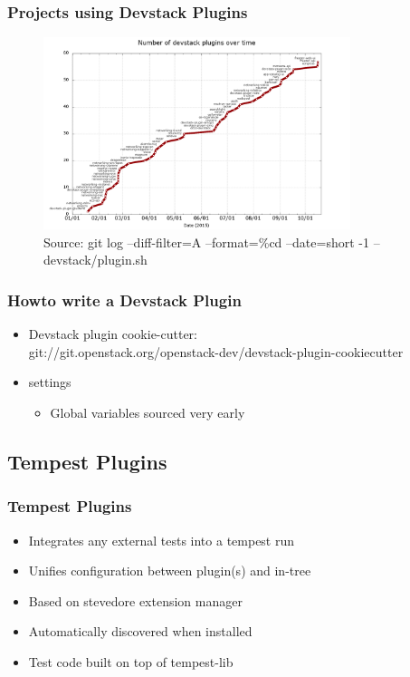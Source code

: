 \documentclass[aspectratio=169,11pt,hyperref={colorlinks=true}]{beamer}
\begin{document}
\begin{frame}
    \frametitle{Projects using Devstack Plugins}
    \begin{figure}[p]
    	\centering
    	\includegraphics[width=0.8\textwidth]{devstack-plugins.png}
    	\caption{Source: git log --diff-filter=A --format=\%cd --date=short -1 -- devstack/plugin.sh}
    \end{figure}
\end{frame}

\begin{frame}
    \frametitle{Howto write a Devstack Plugin}
    \begin{itemize}
    	\item Devstack plugin cookie-cutter: \hfill
    	\\ git://git.openstack.org/openstack-dev/devstack-plugin-cookiecutter
    \end{itemize}

    \begin{itemize}
        \item settings
        \begin{itemize}
            \item Global variables sourced very early 
        \end{itemize}
    \end{itemize}
\end{frame}

\subsection{Tempest Plugins}
\begin{frame}
    \frametitle{Tempest Plugins}
    \begin{itemize}
        \item Integrates any external tests into a tempest run
        \item Unifies configuration between plugin(s) and in-tree
    \end{itemize}
    \begin{itemize}
    	\item{Based on stevedore extension manager}
    	\item{Automatically discovered when installed}
    	\item{Test code built on top of tempest-lib}
    \end{itemize}
\end{frame}
\end{document}
